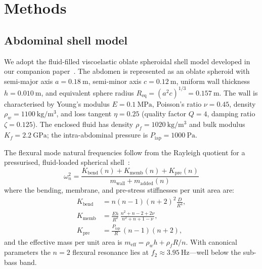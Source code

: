 \section{Methods}
\label{sec:methods}

\subsection{Abdominal shell model}
\label{sec:shell-model}

We adopt the fluid-filled viscoelastic oblate spheroidal shell model
developed in our companion paper~\cite{Mace2026browntone}.  The abdomen
is represented as an oblate spheroid with semi-major axis
$a = \SI{0.18}{\metre}$, semi-minor axis $c = \SI{0.12}{\metre}$,
uniform wall thickness $h = \SI{0.010}{\metre}$, and equivalent sphere
radius $R_\mathrm{eq} = (a^2 c)^{1/3} = \SI{0.157}{\metre}$.  The wall
is characterised by Young's modulus $E = \SI{0.1}{\mega\pascal}$,
Poisson's ratio $\nu = 0.45$, density
$\rho_w = \SI{1100}{\kilogram\per\metre\cubed}$, and loss tangent
$\eta = 0.25$ (quality factor $Q = 4$, damping ratio $\zeta = 0.125$).
The enclosed fluid has density
$\rho_f = \SI{1020}{\kilogram\per\metre\cubed}$ and bulk modulus
$K_f = \SI{2.2}{\giga\pascal}$; the intra-abdominal pressure is
$P_\mathrm{iap} = \SI{1000}{\pascal}$.

The flexural mode natural frequencies follow from the Rayleigh quotient
for a pressurised, fluid-loaded spherical shell~\cite{Junger2012, Lamb1882}:
%
\begin{equation}
  \omega_n^2 = \frac{K_\mathrm{bend}(n) + K_\mathrm{memb}(n)
    + K_\mathrm{pre}(n)}{m_\mathrm{wall} + m_\mathrm{added}(n)}
  \label{eq:flexural-freq}
\end{equation}
%
where the bending, membrane, and pre-stress stiffnesses per unit area
are:
%
\begin{align}
  K_\mathrm{bend} &= n(n-1)(n+2)^2 \frac{D}{R^4}, \\
  K_\mathrm{memb} &= \frac{Eh}{R^2}\,
    \frac{n^2+n-2+2\nu}{n^2+n+1-\nu}, \\
  K_\mathrm{pre}  &= \frac{P_\mathrm{iap}}{R}\,(n-1)(n+2),
\end{align}
%
and the effective mass per unit area is
$m_\mathrm{eff} = \rho_w h + \rho_f R / n$.  With canonical parameters
the $n = 2$ flexural resonance lies at
$f_2 \approx \SI{3.95}{\hertz}$---well below the sub-bass band.

